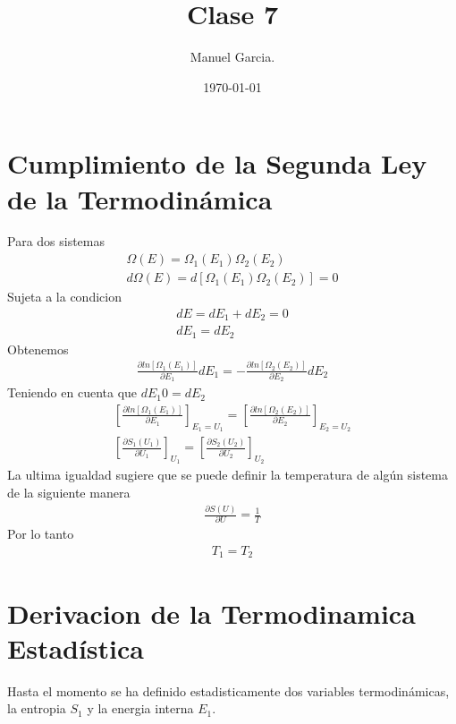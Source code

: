 \documentclass{article}
\title{Clase 7 }
\author{Manuel Garcia.}
\date{\today}
\begin{document}
\maketitle

\section{Cumplimiento de la Segunda Ley de la Termodinámica }
Para dos sistemas 
\begin{gather*}
   \Omega(E) = \Omega_1(E_1)\Omega_2(E_2) \\
   d \Omega (E) = d \left[\Omega_1(E_1)\Omega_2(E_2)\right] = 0 
\end{gather*}
Sujeta a la condicion 
\begin{gather*}
  dE = dE_1 + dE_2 = 0  \\
  dE_1 = dE_2
\end{gather*}
Obtenemos 
\begin{gather*}
  \frac{\partial ln \left[\Omega_1 (E_1 )\right] }{\partial E_1 } dE_1 = -\frac{\partial ln \left[\Omega_2 (E_2 )\right] }{\partial E_2 } dE_2  
\end{gather*}
Teniendo en cuenta que $ dE_1 0 = dE_2  $
\begin{gather*}
  \left[\frac{\partial ln \left[\Omega_1 (E_1 )\right] }{\partial E_1 } \right]_{E_1= U_1} = \left[\frac{\partial ln \left[\Omega_2 (E_2 )\right] }{\partial E_2 } \right] _{E_2 = U_2 } \\
  \left[\frac{\partial S_1(U_1) }{\partial U_1 } \right]_{U_1} = \left[\frac{\partial S_2(U_2) }{\partial U_2 } \right]_{U_2}
\end{gather*}
La ultima igualdad sugiere que se puede definir la temperatura de algún sistema de la siguiente manera 
\begin{gather*}
  \frac{\partial S(U) }{\partial U } = \frac{1}{T} 
\end{gather*}
Por lo tanto 
\begin{gather*}
  T_1 = T_2  
\end{gather*}


\section{Derivacion de la Termodinamica Estadística }
Hasta el momento se ha definido estadisticamente dos variables termodinámicas, la entropia $ S_1  $ y la energia interna $ E_1  $.
\end{document}
